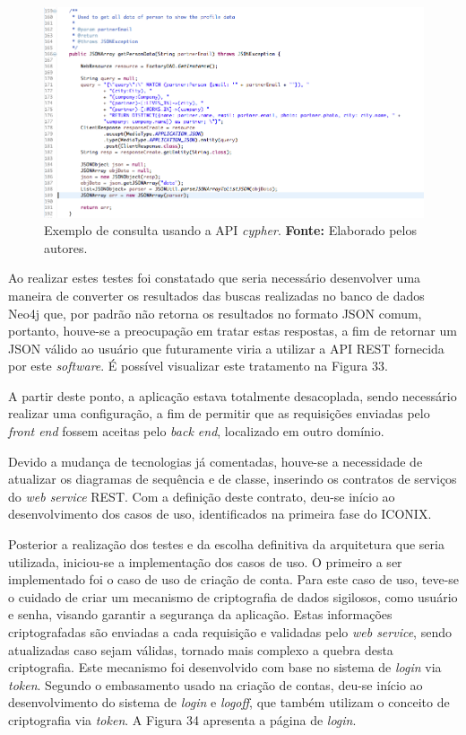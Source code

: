 \newpage 
\begin{figure}[h!]
	\centerline{\includegraphics[scale=0.45]{./imagens/query-cypher.png}}
	\caption[Exemplo de consulta usando a API \textit{cypher}]
	{Exemplo de consulta usando a API \textit{cypher}. \textbf{Fonte:} Elaborado pelos autores.}
	\label{fig:exemplo1}
\end{figure}

\par Ao realizar estes testes foi constatado que seria necessário desenvolver uma maneira de converter os resultados das buscas realizadas no banco de dados Neo4j que, por padrão não retorna os resultados no formato JSON comum, portanto, houve-se a preocupação em tratar estas respostas, a fim de retornar um JSON válido ao usuário que futuramente viria a utilizar a API REST fornecida por este \textit{software}. É possível visualizar este tratamento na Figura 33. 
 
\par A partir deste ponto, a aplicação estava totalmente desacoplada, sendo necessário realizar uma configuração, a fim de permitir que as requisições enviadas pelo \textit{front end} fossem aceitas pelo \textit{back end}, localizado em outro domínio.

\par Devido a mudança de tecnologias já comentadas, houve-se a necessidade de atualizar os diagramas de sequência e de classe, inserindo os contratos de serviços do \textit{web service} REST. Com a definição deste contrato, deu-se início ao desenvolvimento dos casos de uso, identificados na primeira fase do ICONIX. 

\par Posterior a realização dos testes e da escolha definitiva da arquitetura que seria utilizada, iniciou-se a implementação dos casos de uso. O primeiro a ser implementado foi o caso de uso de criação de conta. Para este caso de uso, teve-se o cuidado de criar um mecanismo de criptografia de dados sigilosos, como usuário e senha, visando garantir a segurança da aplicação. Estas informações criptografadas são enviadas a cada requisição e validadas pelo \textit{web service}, sendo atualizadas caso sejam válidas, tornado mais complexo a quebra desta criptografia. Este mecanismo foi desenvolvido com base no sistema de \textit{login} via \textit{token}. Segundo o embasamento usado na criação de contas, deu-se início ao desenvolvimento do sistema de \textit{login} e \textit{logoff}, que também utilizam o conceito de criptografia via \textit{token}. A Figura 34 apresenta a página de \textit{login}.

